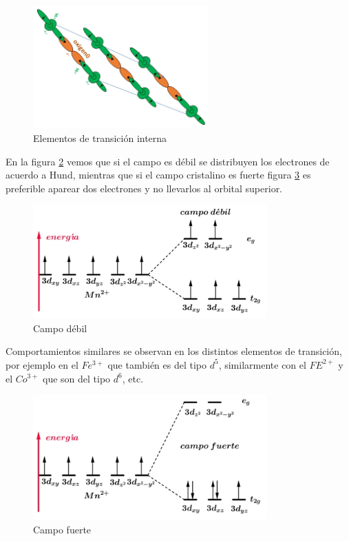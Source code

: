\begin{figure}[H]
    \centering
    \includegraphics[width=0.6\textwidth]{./Figures/estructuraMnO3}
	\caption{Elementos de transición interna}
	\label{fig:estructuraMnO3}
\end{figure}

En la figura \ref{fig:campoDebil} vemos que si el campo es débil se distribuyen los electrones de acuerdo a Hund, mientras que si el campo cristalino es fuerte figura \ref{fig:campoFuerte} es preferible aparear dos electrones y no llevarlos al orbital superior.

\begin{figure}[H]
    \centering
    \includegraphics[width=0.8\textwidth]{./Figures/campoDebil}
	\caption{Campo débil}
	\label{fig:campoDebil}
\end{figure}

Comportamientos similares se observan en los distintos elementos de transición, por ejemplo en el $Fe^{3+}$ que también es del tipo $d^{5}$, similarmente con el $FE^{2+}$ y el $Co^{3+}$ que son del tipo $d^{6}$, etc.

\begin{figure}[H]
    \centering
    \includegraphics[width=0.8\textwidth]{./Figures/campoFuerte}
	\caption{Campo fuerte}
	\label{fig:campoFuerte}
\end{figure}

